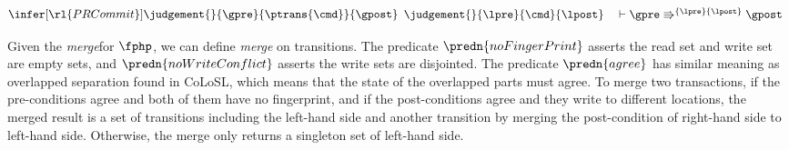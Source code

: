 \[
    \infer[\rl{PRCommit}]{%
        \judgement{}{\gpre}{ \ptrans{\cmd} }{\gpost}
    }{%
        \begin{array}{l}
            \judgement{}{\lpre}{\cmd}{\lpost} \quad 
            \vdash \gpre \Rrightarrow^{\{\lpre\}\{\lpost\}} \gpost
        \end{array}
    }
\]

Given the \emph{merge}for \( \fphp \), we can define \emph{merge} on transitions.
The predicate \( \predn{noFingerPrint} \) asserts the read set and write set are empty sets, and \( \predn{noWriteConflict} \) asserts the write sets are disjointed.
The predicate \( \predn{agree} \) has similar meaning as overlapped separation found in CoLoSL, which means that the state of the overlapped parts must agree.
To merge two transactions, if the pre-conditions agree and both of them have no fingerprint, and if the post-conditions agree and they write to different locations, the merged result is a set of transitions including the left-hand side and another transition by merging the post-condition of right-hand side to left-hand side.
Otherwise, the merge only returns a singleton set of left-hand side.

